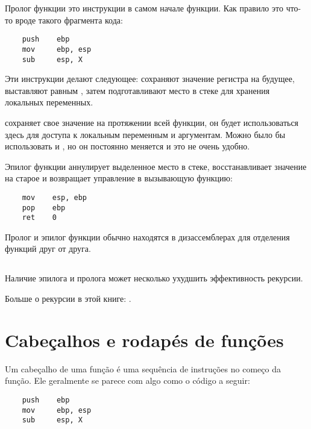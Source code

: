 Пролог функции это инструкции в самом начале функции. Как правило это что-то вроде такого фрагмента кода:

\begin{lstlisting}
    push    ebp
    mov     ebp, esp
    sub     esp, X
\end{lstlisting}

Эти инструкции делают следующее: сохраняют значение регистра \EBP на будущее, выставляют \EBP равным \ESP,
затем подготавливают место в стеке для хранения локальных переменных.

\EBP сохраняет свое значение на протяжении всей функции, он будет использоваться здесь для доступа 
к локальным переменным и аргументам. Можно было бы использовать и \ESP, но он постоянно меняется и 
это не очень удобно.

Эпилог функции аннулирует выделенное место в стеке, восстанавливает значение \EBP на старое и возвращает 
управление в вызывающую функцию:

\begin{lstlisting}
    mov    esp, ebp
    pop    ebp
    ret    0
\end{lstlisting}

Пролог и эпилог функции обычно находятся в дизассемблерах для отделения функций друг от друга.

\ifx\LITE\undefined
\section{\Recursion}

\index{\Recursion}
Наличие эпилога и пролога может несколько ухудшить эффективность рекурсии.

Больше о рекурсии в этой книге: .
\fi %
\fi %

\ifdefined\BRAZILIAN
\chapter{Cabeçalhos e rodapés de funções}
\label{sec:prologepilog}
\index{\PTBRph{}} %
\index{\PTBRph{}} %

Um cabeçalho de uma função é uma sequência de instruções no começo da função. Ele geralmente se parece com algo como o código a seguir:

\begin{lstlisting}
    push    ebp
    mov     ebp, esp
    sub     esp, X
\end{lstlisting}

